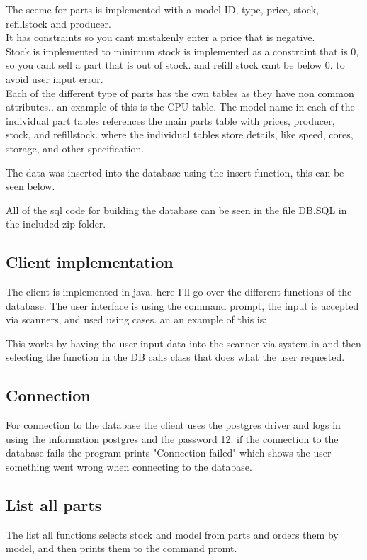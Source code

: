 \documentclass[a4paper,10pt,titlepage]{report}
\begin{document}
The sceme for parts is implemented with a model ID, type, price, stock, refillstock and producer.
\\
It has constraints so you cant mistakenly enter a price that is negative.
\\
Stock is implemented to minimum stock is implemented as a constraint that is 0, so you cant sell a part that is out of stock. and refill stock cant be below 0. to avoid user input error.
\\ \vspace{2 mm}
Each of the different type of parts has the own tables as they have non common attributes.. an example of this is the CPU table. The model name in each of the individual part tables references the main parts table with prices, producer, stock, and refillstock. where the individual tables store details, like speed, cores, storage, and other specification.

The data was inserted into the database using the insert function, this can be seen below. 

\vspace{5 mm}
All of the sql code for building the database can be seen in the file DB.SQL in the included zip folder.
\newpage
\subsection{Client implementation}
The client is implemented in java. here I'll go over the different functions of the database.
The user interface is using the command prompt, the input is accepted via scanners, and used using cases. an an example of this is:

This works by having the user input data into the scanner via system.in and then selecting the function in the DB calls class that does what the user requested.
\subsection{Connection}
For connection to the database the client uses the postgres driver and logs in using the information postgres and the password 12. if the connection to the database fails the program prints "Connection failed" which shows the user something went wrong when connecting to the database.

\subsection{List all parts}
The list all functions selects stock and model from parts and orders them by model, and then prints them to the command promt.

\end{document}
